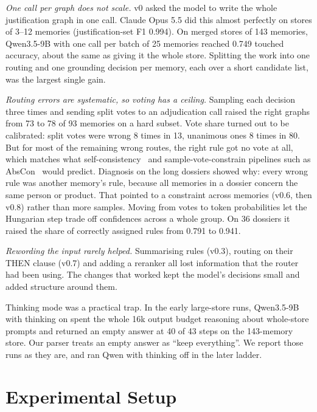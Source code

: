 \documentclass[conference]{IEEEtran}
\begin{document}
\textit{One call per graph does not scale.} v0 asked the model to write the whole justification graph in one call. Claude Opus 5.5 did this almost perfectly on stores of 3--12 memories (justification-set F1 0.994). On merged stores of 143 memories, Qwen3.5-9B with one call per batch of 25 memories reached 0.749 touched accuracy, about the same as giving it the whole store. Splitting the work into one routing and one grounding decision per memory, each over a short candidate list, was the largest single gain.

\textit{Routing errors are systematic, so voting has a ceiling.} Sampling each decision three times and sending split votes to an adjudication call raised the right graphs from 73 to 78 of 93 memories on a hard subset. Vote share turned out to be calibrated: split votes were wrong 8 times in 13, unanimous ones 8 times in 80. But for most of the remaining wrong routes, the right rule got no vote at all, which matches what self-consistency~\cite{wang2023selfconsistency} and sample-vote-constrain pipelines such as AbsCon~\cite{chen2025abscon} would predict. Diagnosis on the long dossiers showed why: every wrong rule was another memory's rule, because all memories in a dossier concern the same person or product. That pointed to a constraint across memories (v0.6, then v0.8) rather than more samples. Moving from votes to token probabilities let the Hungarian step trade off confidences across a whole group. On 36 dossiers it raised the share of correctly assigned rules from 0.791 to 0.941.

\textit{Rewording the input rarely helped.} Summarising rules (v0.3), routing on their THEN clause (v0.7) and adding a reranker all lost information that the router had been using. The changes that worked kept the model's decisions small and added structure around them.

Thinking mode was a practical trap. In the early large-store runs, Qwen3.5-9B with thinking on spent the whole 16k output budget reasoning about whole-store prompts and returned an empty answer at 40 of 43 steps on the 143-memory store. Our parser treats an empty answer as ``keep everything''. We report those runs as they are, and ran Qwen with thinking off in the later ladder.

\section{Experimental Setup}
\label{sec:setup}
\end{document}
